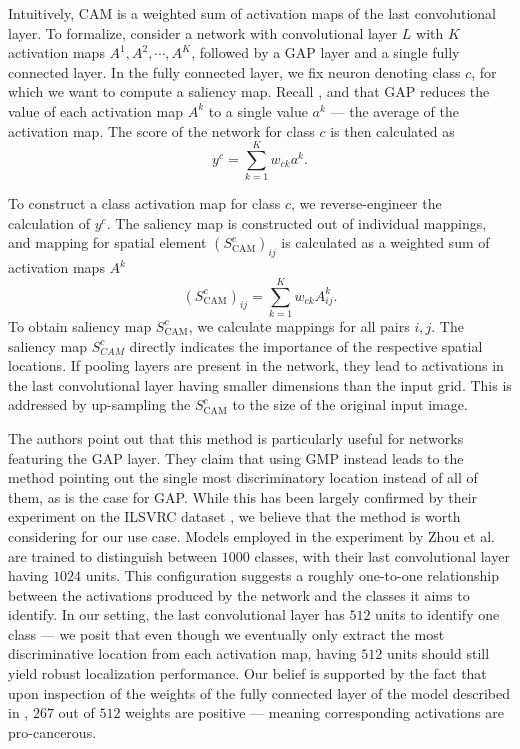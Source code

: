 Intuitively, CAM is a weighted sum of activation maps of the last convolutional layer.
To formalize, consider a network with convolutional layer $L$ with $K$ activation maps $A^1, A^2, \cdots, A^K$, followed by a GAP layer and a single fully connected layer.
In the fully connected layer, we fix neuron denoting class $c$, for which we want to compute a saliency map.
Recall , and that GAP reduces the value of each activation map $A^k$ to a single value $a^k$ --- the average of the activation map.
The score of the network for class $c$ is then calculated as
\begin{equation}\label{eq:gap-score}
    y^c = \sum_{k=1}^K w_{ck} a^k.
\end{equation}

To construct a class activation map for class $c$, we reverse-engineer the calculation of $y^c$. The saliency map is constructed out of individual mappings, and mapping for spatial element $(S^c_{\text{CAM}})_{ij}$ is calculated as a weighted sum of activation maps $A^k$
\begin{equation}\label{eq:cam}
    (S^c_{\text{CAM}})_{ij} = \sum_{k=1}^K w_{ck}  A^k_{ij}.
\end{equation}
To obtain saliency map $S^c_{\text{CAM}}$, we calculate mappings for all pairs $i, j$.
The saliency map $S^c_{CAM}$ directly indicates the importance of the respective spatial locations.
If pooling layers are present in the network, they lead to activations in the last convolutional layer having smaller dimensions than the input grid.
This is addressed by up-sampling the $S^c_{\text{CAM}}$ to the size of the original input image.

The authors point out that this method is particularly useful for networks featuring the GAP layer.
They claim that using GMP instead leads to the method pointing out the single most discriminatory location instead of all of them, as is the case for GAP.
While this has been largely confirmed by their experiment on the ILSVRC dataset \cite{ilsvrc}, we believe that the method is worth considering for our use case.
Models employed in the experiment by Zhou et al. \cite{cam} are trained to distinguish between $1000$ classes, with their last convolutional layer having $1024$ units.
This configuration suggests a roughly one-to-one relationship between the activations produced by the network and the classes it aims to identify.
In our setting, the last convolutional layer has $512$ units to identify one class --- we posit that even though we eventually only extract the most discriminative location from each activation map, having $512$ units should still yield robust localization performance.
Our belief is supported by the fact that upon inspection of the weights of the fully connected layer of the model described in , $267$ out of $512$ weights are positive --- meaning corresponding activations are pro-cancerous.

